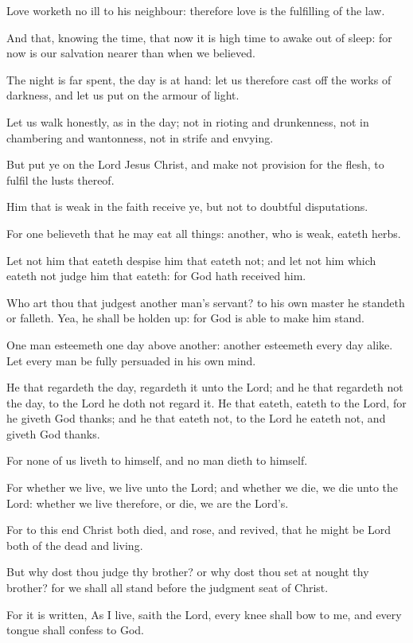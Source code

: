 \Verse Love worketh no ill to his neighbour: therefore love is the fulfilling of the law.

\Verse And that, knowing the time, that now it is high time to awake out of sleep: for now is our salvation nearer than when we believed.

\Verse The night is far spent, the day is at hand: let us therefore cast off the works of darkness, and let us put on the armour of light.

\Verse Let us walk honestly, as in the day; not in rioting and drunkenness, not in chambering and wantonness, not in strife and envying.

\Verse But put ye on the Lord Jesus Christ, and make not provision for the flesh, to fulfil the lusts thereof.


\Chapter
\Verse Him that is weak in the faith receive ye, but not to doubtful disputations.

\Verse For one believeth that he may eat all things: another, who is weak, eateth herbs.

\Verse Let not him that eateth despise him that eateth not; and let not him which eateth not judge him that eateth: for God hath received him.

\Verse Who art thou that judgest another man's servant? to his own master he standeth or falleth. Yea, he shall be holden up: for God is able to make him stand.

\Verse One man esteemeth one day above another: another esteemeth every day alike. Let every man be fully persuaded in his own mind.

\Verse He that regardeth the day, regardeth it unto the Lord; and he that regardeth not the day, to the Lord he doth not regard it. He that eateth, eateth to the Lord, for he giveth God thanks; and he that eateth not, to the Lord he eateth not, and giveth God thanks.

\Verse For none of us liveth to himself, and no man dieth to himself.

\Verse For whether we live, we live unto the Lord; and whether we die, we die unto the Lord: whether we live therefore, or die, we are the Lord's.

\Verse For to this end Christ both died, and rose, and revived, that he might be Lord both of the dead and living.

\Verse But why dost thou judge thy brother? or why dost thou set at nought thy brother? for we shall all stand before the judgment seat of Christ.

\Verse For it is written, As I live, saith the Lord, every knee shall bow to me, and every tongue shall confess to God.

